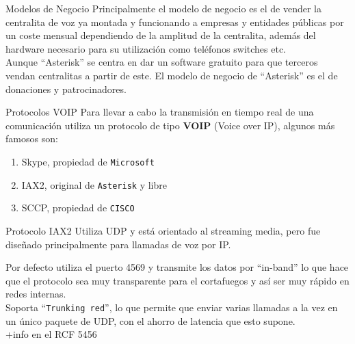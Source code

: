 \documentclass[11pt]{beamer}
\begin{document}
\begin{frame}{Modelos de Negocio}
Principalmente el modelo de negocio es el de vender la centralita de voz 
ya montada y funcionando a empresas y entidades públicas por un coste 
mensual dependiendo de la amplitud de la centralita, además del hardware
necesario para su utilización como teléfonos switches etc.
\\
\vspace*{1cm}
Aunque ``Asterisk'' se centra en dar un software gratuito para que terceros vendan centralitas a partir de este. El modelo de negocio
de ``Asterisk'' es el de donaciones y patrocinadores.
\end{frame}



\begin{frame}{Protocolos VOIP}
Para llevar a cabo la transmisión en tiempo real de una comunicación 
utiliza un protocolo de tipo \textbf{VOIP} (Voice over IP), algunos más
famosos son:
\begin{enumerate}
\item Skype, propiedad de \texttt{Microsoft}
\item IAX2, original de \texttt{Asterisk} y libre
\item SCCP, propiedad de \texttt{CISCO}
\end{enumerate}
\end{frame}

\begin{frame}{Protocolo IAX2}
Utiliza UDP y está orientado al streaming media, pero fue diseñado principalmente para llamadas de voz por IP.\\
\vspace*{1cm}

Por defecto utiliza el puerto 4569 y transmite los datos por ``in-band'' 
lo que hace que el protocolo sea muy transparente para el cortafuegos y
 así ser muy rápido en redes internas.\\
\vspace*{0.5cm}
Soporta ``\texttt{Trunking red}'', lo que permite que enviar varias llamadas a la vez en un único paquete de UDP, con el ahorro de latencia que esto supone. \\
\vspace*{0.5cm}
+info en el RCF 5456
\end{frame}
\end{document}

